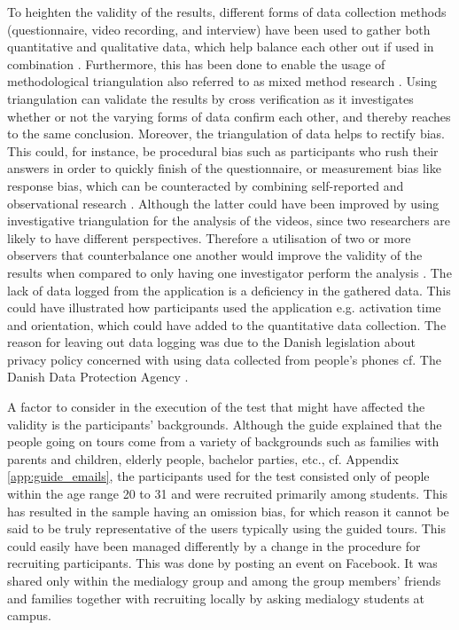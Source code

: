 To heighten the validity of the results, different forms of data collection methods (questionnaire, video recording, and interview) have been used to gather both quantitative and qualitative data, which help balance each other out if used in combination . Furthermore, this has been done to enable the usage of methodological triangulation also referred to as mixed method research \cite{Kennedy}. Using triangulation can validate the results by cross verification as it investigates whether or not the varying forms of data confirm each other, and thereby reaches to the same conclusion. Moreover, the triangulation of data helps to rectify bias. This could, for instance, be procedural bias such as participants who rush their answers in order to quickly finish of the questionnaire, or measurement bias like response bias, which can be counteracted by combining self-reported and observational research \cite{Kennedy}. Although the latter could have been improved by using investigative triangulation for the analysis of the videos, since two researchers are likely to have different perspectives. Therefore a utilisation of two or more observers that counterbalance one another would improve the validity of the results when compared to only having one investigator perform the analysis \cite{Kennedy}. The lack of data logged from the application is a deficiency in the gathered data. This could have illustrated how participants used the application e.g. activation time and orientation, which could have added to the quantitative data collection. The reason for leaving out data logging was due to the Danish legislation about privacy policy concerned with using data collected from people’s phones cf. The Danish Data Protection Agency \cite{Datatilsynet}.

A factor to consider in the execution of the test that might have affected the validity is the participants’ backgrounds. Although the guide explained that the people going on tours come from a variety of backgrounds such as families with parents and children, elderly people, bachelor parties, etc., cf. Appendix \ref{app:guide_emails}, the participants used for the test consisted only of people within the age range 20 to 31 and were recruited primarily among students. This has resulted in the sample having an omission bias, for which reason it cannot be said to be truly representative of the users typically using the guided tours. This could easily have been managed differently by a change in the procedure for recruiting participants. This was done by posting an event on Facebook. It was shared only within the medialogy group and among the group members’ friends and families together with recruiting locally by asking medialogy students at campus.

